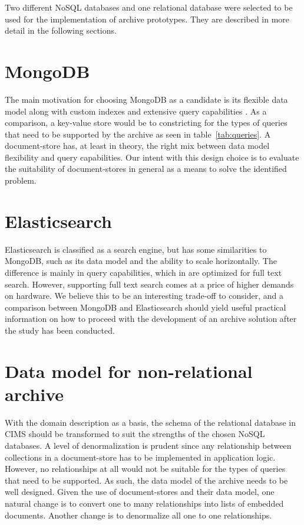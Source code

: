 Two different NoSQL databases and one relational database were selected to be used for the implementation of archive prototypes. They are described in more detail in the following sections.

\section{MongoDB}
The main motivation for choosing MongoDB as a candidate is its flexible data model along with custom indexes and extensive query capabilities \cite{Catell}. As a comparison, a key-value store would be to constricting for the types of queries that need to be supported by the archive as seen in table~\ref{tab:queries}. A document-store has, at least in theory, the right mix between data model flexibility and query capabilities. Our intent with this design choice is to evaluate the suitability of document-stores in general as a means to solve the identified problem. 

\section{Elasticsearch}
Elasticsearch is classified as a search engine, but has some similarities to MongoDB, such as its data model and the ability to scale horizontally. The difference is mainly in query capabilities, which in are optimized for full text search. However, supporting full text search comes at a price of higher demands on hardware. We believe this to be an interesting trade-off to consider, and a comparison between MongoDB and Elasticsearch should yield useful practical information on how to proceed with the development of an archive solution after the study has been conducted.

\section{Data model for non-relational archive} \label{nosqlmodel}
With the domain description as a basis, the schema of the relational database in CIMS should be transformed to suit the strengths of the chosen NoSQL databases. A level of denormalization is prudent since any relationship between collections in a document-store has to be implemented in application logic. However, no relationships at all would not be suitable for the types of queries that need to be supported. As such, the data model of the archive needs to be well designed. Given the use of document-stores and their data model, one natural change is to convert one to many relationships into lists of embedded documents. Another change is to denormalize all one to one relationships.

